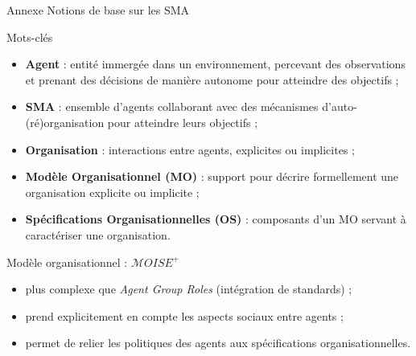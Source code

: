 \begin{frame}{Annexe}
    {Notions de base sur les SMA}

    \begin{block}{Mots-clés}
        \begin{itemize}
            \item \textbf{Agent} : entité immergée dans un environnement, percevant des observations et prenant des décisions de manière autonome pour atteindre des objectifs ;
            \item \textbf{SMA} : ensemble d’agents collaborant avec des mécanismes d’auto-(ré)organisation pour atteindre leurs objectifs ;
            \item \textbf{Organisation} : interactions entre agents, explicites ou implicites ;
            \item \textbf{Modèle Organisationnel (MO)} : support pour décrire formellement une organisation explicite ou implicite ;
            \item \textbf{Spécifications Organisationnelles (OS)} : composants d’un MO servant à caractériser une organisation.
        \end{itemize}
    \end{block}

    \begin{block}{Modèle organisationnel : $\mathcal{M}OISE^+$}
        \begin{itemize}
            \item plus complexe que \emph{Agent Group Roles} (intégration de standards) ;
            \item prend explicitement en compte les aspects sociaux entre agents ;
            \item permet de relier les politiques des agents aux spécifications organisationnelles.
        \end{itemize}
    \end{block}

\end{frame}
